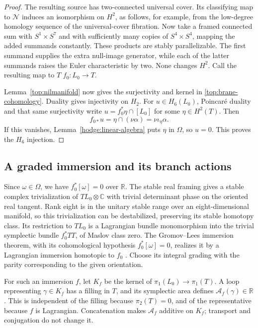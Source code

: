 \documentclass[11pt]{article}
\theoremstyle{definition}
\theoremstyle{remark}
\numberwithin{equation}{section}
\begin{document}
\begin{proof}
The resulting source has two-connected universal cover.  Its
classifying map to $\mathcal N$ induces an isomorphism on $H^2$,
as follows, for example, from the low-degree homology sequence of the
universal-cover fibration.  Now take a framed connected sum with
$S^1\times S^7$ and with sufficiently many copies of
$S^4\times S^4$, mapping the added summands constantly.  These
products are stably parallelizable.  The first summand supplies the
extra null-image generator, while each of the latter summands raises
the Euler characteristic by two.  None changes $H^2$.  Call the
resulting map to $T$ $f_0:L_0\to T$.

Lemma~\ref{top:nilmanifold} now gives the surjectivity and kernel in
\eqref{top:brane-cohomology}.  Duality gives injectivity on $H_2$.
For $u\in H_6(L_0)$, Poincar\'e duality and that same surjectivity
write $u=f_0^*\eta\cap[L_0]$ for some $\eta\in H^2(T)$.  Then
\[
 f_{0*}u=\eta\cap(\nu\alpha)=\nu\iota_\eta\alpha.
\]
If this vanishes, Lemma~\ref{hodge:linear-algebra} puts $\eta$ in
$\Omega$, so $u=0$.  This proves the $H_6$ injection.
\end{proof}

\subsection{A graded immersion and its branch actions}

Since $\omega\in\Omega$, we have $f_0^*[\omega]=0$ over $\mathbb R$.
The stable real framing gives a stable complex trivialization of
$TL_0\otimes\mathbb C$ with trivial determinant phase on the oriented real
tangent.  Rank eight is in the unitary stable range over an
eight-dimensional manifold, so this trivialization can be
destabilized, preserving its stable homotopy class.  Its restriction
to $TL_0$ is a Lagrangian bundle monomorphism into the trivial
symplectic bundle $f_0^*TT$, of Maslov class zero.  The
Gromov--Lees immersion theorem, with its cohomological hypothesis
$f_0^*[\omega]=0$, realizes it by a Lagrangian immersion homotopic to
$f_0$ \cite[Theorem~2.3]{gromov-lees}.  Choose its integral grading
with the parity corresponding to the given orientation.

For such an immersion $f$, let $K_f$ be the kernel of
$\pi_1(L_0)\to\pi_1(T)$.  A loop representing $\gamma\in K_f$
has a filling in $T$, and its symplectic area defines
$\mathcal A_f(\gamma)\in\mathbb R$.  This is independent of the filling
because $\pi_2(T)=0$, and of the representative because $f$ is
Lagrangian.  Concatenation makes $\mathcal A_f$ additive on $K_f$;
transport and conjugation do not change it.
\end{document}
